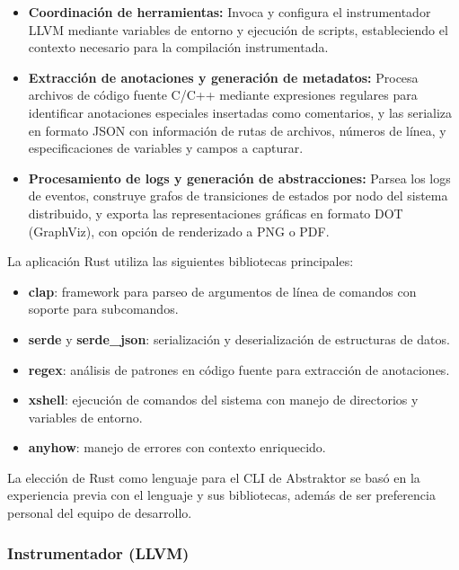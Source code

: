 \documentclass[12pt]{article}
\begin{document}
\begin{itemize}
    \item \textbf{Coordinación de herramientas:} Invoca y configura el instrumentador LLVM mediante variables de entorno y ejecución de scripts, estableciendo el contexto necesario para la compilación instrumentada.
    
    \item \textbf{Extracción de anotaciones y generación de metadatos:} Procesa archivos de código fuente C/C++ mediante expresiones regulares para identificar anotaciones especiales insertadas como comentarios, y las serializa en formato JSON con información de rutas de archivos, números de línea, y especificaciones de variables y campos a capturar.
    
    \item \textbf{Procesamiento de logs y generación de abstracciones:} Parsea los logs de eventos, construye grafos de transiciones de estados por nodo del sistema distribuido, y exporta las representaciones gráficas en formato DOT (GraphViz), con opción de renderizado a PNG o PDF.
\end{itemize}

La aplicación Rust utiliza las siguientes bibliotecas principales:

\begin{itemize}
    \item \textbf{clap}: framework para parseo de argumentos de línea de comandos con soporte para subcomandos.
    \item \textbf{serde} y \textbf{serde\_json}: serialización y deserialización de estructuras de datos.
    \item \textbf{regex}: análisis de patrones en código fuente para extracción de anotaciones.
    \item \textbf{xshell}: ejecución de comandos del sistema con manejo de directorios y variables de entorno.
    \item \textbf{anyhow}: manejo de errores con contexto enriquecido.
\end{itemize}

La elección de Rust como lenguaje para el CLI de Abstraktor se basó en la experiencia previa con el lenguaje y sus bibliotecas, además de ser preferencia personal del equipo de desarrollo.


\subsubsection{Instrumentador (LLVM)}
\end{document}

